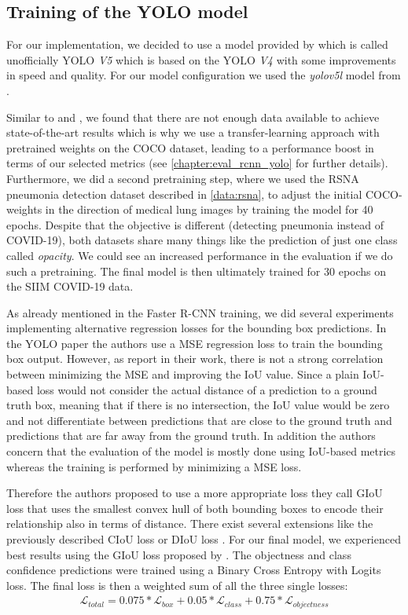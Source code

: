 \subsection*{Training of the \ac{YOLO} model}
For our implementation, we decided to use a model provided by \autocite{yolov5} which is called unofficially YOLO \textit{V5} which is based on the YOLO \textit{V4} with some improvements in speed and quality. For our model configuration we used the \textit{yolov5l} model from \autocite{yolov5}.

Similar to \autocite{CoronaDLTransfer} and  \autocite{mangal2020covidaid}, we found that there are not enough data available to achieve state-of-the-art results which is why we use a transfer-learning approach with pretrained weights on the COCO dataset, leading to a performance boost in terms of our selected metrics (see \vref{chapter:eval_rcnn_yolo} for further details). Furthermore, we did a second pretraining step, where we used the RSNA pneumonia detection dataset described in \vref{data:rsna}, to adjust the initial COCO-weights in the direction of medical lung images by training the model for 40 epochs. Despite that the objective is different (detecting pneumonia instead of COVID-19), both datasets share many things like the prediction of just one class called \textit{opacity}. We could see an increased performance in the evaluation if we do such a pretraining. The final model is then ultimately trained for 30 epochs on the SIIM COVID-19 data.

As already mentioned in the Faster \ac{R-CNN} training, we did several experiments implementing alternative regression losses for the bounding box predictions. In the \ac{YOLO} paper the authors use a \ac{MSE} regression loss to train the bounding box output. However, as \citeauthor{giou} \autocite{giou} report in their work, there is not a strong correlation between minimizing the \ac{MSE} and improving the \ac{IoU} value. Since a plain \ac{IoU}-based loss would not consider the actual distance of a prediction to a ground truth box, meaning that if there is no intersection, the \ac{IoU} value would be zero and not differentiate between predictions that are close to the ground truth and predictions that are far away from the ground truth.
In addition the authors concern that the evaluation of the model is mostly done using \ac{IoU}-based metrics whereas the training is performed by minimizing a \ac{MSE} loss.

Therefore the authors proposed to use a more appropriate loss they call \ac{GIoU} loss that uses the smallest convex hull of both bounding boxes to encode their relationship also in terms of distance. There exist several extensions like the previously described \ac{CIoU} loss \autocite{zheng_enhancing_2021} or \ac{DIoU} loss \autocite{DIoU}. For our final model, we experienced best results using the \ac{GIoU} loss proposed by \citeauthor{giou}.
The objectness and class confidence predictions were trained using a Binary Cross Entropy with Logits loss. The final loss is then a weighted sum of all the three single losses:
\begin{align}
	\mathcal{L}_{total} = 0.075 * \mathcal{L}_{box} + 0.05 * \mathcal{L}_{class} + 0.75* \mathcal{L}_{objectness}
\end{align} 

